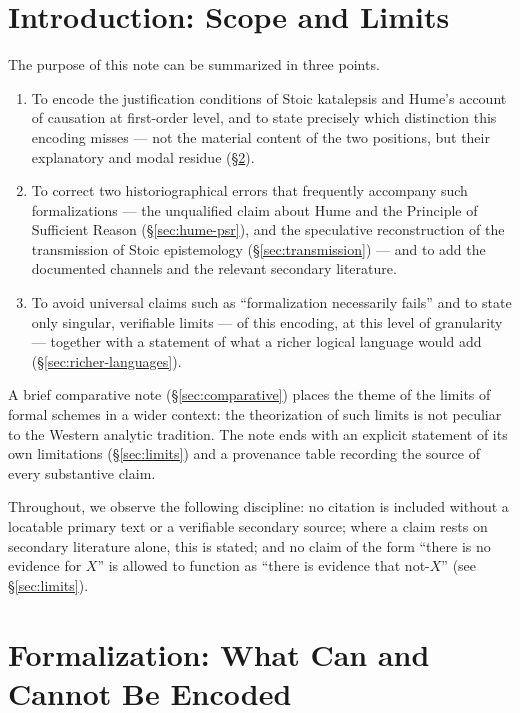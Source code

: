 \documentclass[11pt]{article}
\theoremstyle{plain}
\theoremstyle{definition}
\theoremstyle{remark}
\begin{document}
\tableofcontents

\section{Introduction: Scope and Limits}
\label{sec:intro}

The purpose of this note can be summarized in three points.

\begin{enumerate}
\item To encode the justification conditions of Stoic katalepsis and
Hume's account of causation at first-order level, and to state
precisely which distinction this encoding misses --- not the material
content of the two positions, but their explanatory and modal residue
(\S\ref{sec:formalization}).
\item To correct two historiographical errors that frequently accompany
such formalizations --- the unqualified claim about Hume and the
Principle of Sufficient Reason (\S\ref{sec:hume-psr}), and the
speculative reconstruction of the transmission of Stoic epistemology
(\S\ref{sec:transmission}) --- and to add the documented channels and
the relevant secondary literature.
\item To avoid universal claims such as ``formalization necessarily
fails'' and to state only singular, verifiable limits --- of this
encoding, at this level of granularity --- together with a statement of
what a richer logical language would add (\S\ref{sec:richer-languages}).
\end{enumerate}

A brief comparative note (\S\ref{sec:comparative}) places the theme of
the limits of formal schemes in a wider context: the theorization of
such limits is not peculiar to the Western analytic tradition. The note
ends with an explicit statement of its own limitations
(\S\ref{sec:limits}) and a provenance table recording the source of
every substantive claim.

Throughout, we observe the following discipline: no citation is
included without a locatable primary text or a verifiable secondary
source; where a claim rests on secondary literature alone, this is
stated; and no claim of the form ``there is no evidence for $X$'' is
allowed to function as ``there is evidence that not-$X$'' (see
\S\ref{sec:limits}).

\section{Formalization: What Can and Cannot Be Encoded}
\label{sec:formalization}
\end{document}
